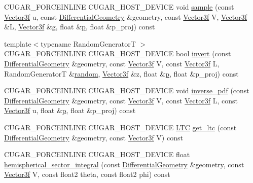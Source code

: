 \begin{DoxyCompactItemize}
\item 
C\+U\+G\+A\+R\+\_\+\+F\+O\+R\+C\+E\+I\+N\+L\+I\+NE C\+U\+G\+A\+R\+\_\+\+H\+O\+S\+T\+\_\+\+D\+E\+V\+I\+CE void \hyperlink{structcugar_1_1_l_t_c_bsdf_a6c2148d6ccc764cf424d50e7c106bded}{sample} (const \hyperlink{structcugar_1_1_vector}{Vector3f} u, const \hyperlink{structcugar_1_1_differential_geometry}{Differential\+Geometry} \&geometry, const \hyperlink{structcugar_1_1_vector}{Vector3f} V, \hyperlink{structcugar_1_1_vector}{Vector3f} \&L, \hyperlink{structcugar_1_1_vector}{Vector3f} \&g, float \&\hyperlink{structcugar_1_1_l_t_c_bsdf_a0e537e0db592b6bbc37bdae20b575ea3}{p}, float \&p\+\_\+proj) const
\item 
{\footnotesize template$<$typename Random\+GeneratorT $>$ }\\C\+U\+G\+A\+R\+\_\+\+F\+O\+R\+C\+E\+I\+N\+L\+I\+NE C\+U\+G\+A\+R\+\_\+\+H\+O\+S\+T\+\_\+\+D\+E\+V\+I\+CE bool \hyperlink{structcugar_1_1_l_t_c_bsdf_ab39d377d432dd5c39fe5942e245ba41a}{invert} (const \hyperlink{structcugar_1_1_differential_geometry}{Differential\+Geometry} \&geometry, const \hyperlink{structcugar_1_1_vector}{Vector3f} V, const \hyperlink{structcugar_1_1_vector}{Vector3f} L, Random\+GeneratorT \&\hyperlink{group___sampling_module_gaec17bbbfd36295353081b7b4480d933d}{random}, \hyperlink{structcugar_1_1_vector}{Vector3f} \&z, float \&\hyperlink{structcugar_1_1_l_t_c_bsdf_a0e537e0db592b6bbc37bdae20b575ea3}{p}, float \&p\+\_\+proj) const
\item 
C\+U\+G\+A\+R\+\_\+\+F\+O\+R\+C\+E\+I\+N\+L\+I\+NE C\+U\+G\+A\+R\+\_\+\+H\+O\+S\+T\+\_\+\+D\+E\+V\+I\+CE void \hyperlink{structcugar_1_1_l_t_c_bsdf_a738943bbfae195948389c33804e18ab2}{inverse\+\_\+pdf} (const \hyperlink{structcugar_1_1_differential_geometry}{Differential\+Geometry} \&geometry, const \hyperlink{structcugar_1_1_vector}{Vector3f} V, const \hyperlink{structcugar_1_1_vector}{Vector3f} L, const \hyperlink{structcugar_1_1_vector}{Vector3f} u, float \&\hyperlink{structcugar_1_1_l_t_c_bsdf_a0e537e0db592b6bbc37bdae20b575ea3}{p}, float \&p\+\_\+proj) const
\item 
C\+U\+G\+A\+R\+\_\+\+F\+O\+R\+C\+E\+I\+N\+L\+I\+NE C\+U\+G\+A\+R\+\_\+\+H\+O\+S\+T\+\_\+\+D\+E\+V\+I\+CE \hyperlink{structcugar_1_1_l_t_c_bsdf_1_1_l_t_c}{L\+TC} \hyperlink{structcugar_1_1_l_t_c_bsdf_ad00d69ec594ae3b9fdd0d58822cc35da}{get\+\_\+ltc} (const \hyperlink{structcugar_1_1_differential_geometry}{Differential\+Geometry} \&geometry, const \hyperlink{structcugar_1_1_vector}{Vector3f} V) const
\item 
C\+U\+G\+A\+R\+\_\+\+F\+O\+R\+C\+E\+I\+N\+L\+I\+NE C\+U\+G\+A\+R\+\_\+\+H\+O\+S\+T\+\_\+\+D\+E\+V\+I\+CE float \hyperlink{structcugar_1_1_l_t_c_bsdf_a091fd533ea3fe05f3f1fd915305a30b3}{hemispherical\+\_\+sector\+\_\+integral} (const \hyperlink{structcugar_1_1_differential_geometry}{Differential\+Geometry} \&geometry, const \hyperlink{structcugar_1_1_vector}{Vector3f} V, const float2 theta, const float2 phi) const
\end{DoxyCompactItemize}
